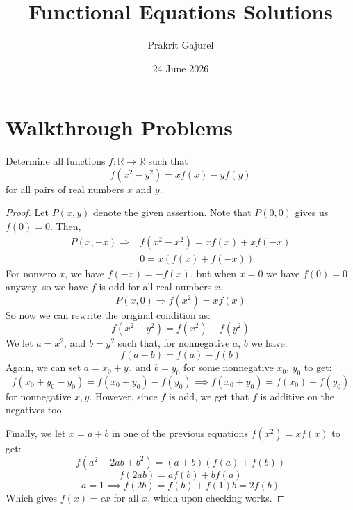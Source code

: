 \documentclass[11pt]{scrartcl}
\begin{document}
\title{Functional Equations Solutions}
\author{Prakrit Gajurel}
\date{24 June 2026}
\maketitle

\section{Walkthrough Problems}

\begin{problem}
    [USAMO 2002]
    Determine all functions $f: \mathbb{R} \rightarrow \mathbb{R}$ such that
    \[
    f(x^2-y^2) = xf(x) - yf(y)
    \]
    for all pairs of real numbers $x$ and $y$.
    
\end{problem}

\begin{proof}
    Let $P(x, y)$ denote the given assertion. Note that $P(0,0)$ gives us $f(0)=0$. Then,
    \begin{align*}
        P(x, -x) \Longrightarrow &f(x^2-x^2) = xf(x) + xf(-x)
        \\& 0 = x(f(x)+f(-x))
    \end{align*}
    For nonzero $x$, we have $f(-x) = -f(x)$, but when $x=0$ we have $f(0)=0$ anyway, so we have $f$ is odd for all real numbers $x$.
    \[
    P(x,0) \Longrightarrow f(x^2) = xf(x)
    \]
    So now we can rewrite the original condition as:
    \[
    f(x^2 - y^2) = f(x^2) - f(y^2)
    \]
    We let $a = x^2$, and $b = y^2$ such that, for nonnegative $a$, $b$ we have:
    \[
    f(a-b) = f(a) - f(b)
    \]
    Again, we can set $a=x_0 + y_0$ and $b=y_0$ for some nonnegative $x_0$, $y_0$ to get:
    \[
    f(x_0+y_0-y_0) = f(x_0+y_0) - f(y_0) \implies f(x_0 + y_0) = f(x_0) + f(y_0)
    \]
    for nonnegative $x, y$. However, since $f$ is odd, we get that $f$ is additive on the negatives too.

    Finally, we let $x=a+b$ in one of the previous equations $f(x^2) = xf(x)$ to get:
    \[
    f(a^2 + 2ab + b^2) = (a+b)(f(a) + f(b))
    \]
    \[
      f(2ab) = af(b) + bf(a)
    \]
    \[
      a = 1 \implies f(2b) = f(b) + f(1)b = 2f(b)
    \]
    Which gives $f(x) = cx$ for all $x$, which upon checking works.
\end{proof}
\end{document}

